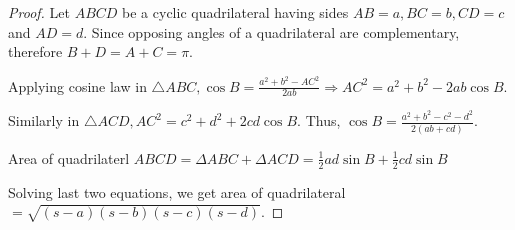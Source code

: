 \begin{proof}
  Let $ABCD$ be a cyclic quadrilateral having sides $AB = a, BC = b, CD = c$ and $AD = d$. Since opposing angles of a quadrilateral
  are complementary, therefore $B + D = A + C = \pi$.

  Applying cosine law in $\triangle ABC, \cos B = \frac{a^2 + b^2 - AC^2}{2ab}\Rightarrow AC^2 = a^2 + b^2 - 2ab\cos B$.

  Similarly in $\triangle ACD, AC^2 = c^2 + d^2 + 2cd \cos B$. Thus, $\cos B = \frac{a^2 + b^2 - c^2 - d^2}{2(ab + cd)}$.

  Area of quadrilaterl $ABCD = \Delta ABC + \Delta ACD = \frac{1}{2}ad\sin B + \frac{1}{2}cd \sin B$

  Solving last two equations, we get area of quadrilateral $= \sqrt{(s - a)(s - b)(s - c)(s - d)}$.
\end{proof}

